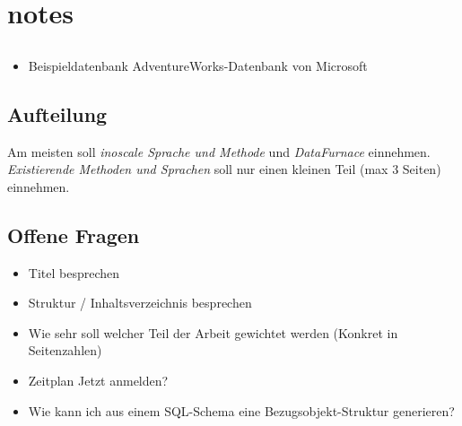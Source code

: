 \chapter{notes}
\section{}
\begin{itemize}
  \item Beispieldatenbank AdventureWorks-Datenbank von Microsoft
\end{itemize}

\section{Aufteilung}
Am meisten soll \textit{inoscale Sprache und Methode} und \textit{DataFurnace} einnehmen. \textit{Existierende Methoden und Sprachen} soll nur einen kleinen Teil (max 3 Seiten) einnehmen.


\section{Offene Fragen}
\begin{itemize}
  \item Titel besprechen
  \item Struktur / Inhaltsverzeichnis besprechen
  \item Wie sehr soll welcher Teil der Arbeit gewichtet werden (Konkret in Seitenzahlen)
  \item Zeitplan Jetzt anmelden?
  \item Wie kann ich aus einem SQL-Schema eine Bezugsobjekt-Struktur generieren?
\end{itemize}
